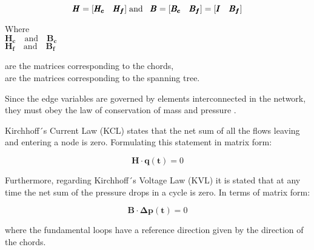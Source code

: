\begin{equation}
\pmb{H} = [\pmb{H_c} \quad \pmb{H_f}]
\hspace{0.1cm} \text{and}\hspace{0.3cm}
\pmb{B} = [\pmb{B_c}  \quad \pmb{B_f}] = [\pmb{I} \quad \pmb{B_f}]
\label{HandB}
\end{equation}

\begin{minipage}[t]{0.20\textwidth}
Where\\
\hspace*{8mm} $\pmb{H_c} \quad \text{and} \quad \pmb{B_c}$ \\
\hspace*{8mm} $\pmb{H_f} \quad \text{and} \quad \pmb{B_f}$ 
\end{minipage}
\begin{minipage}[t]{0.68\textwidth}
\vspace*{2mm}
\hspace*{8mm} are the matrices corresponding to the chords,\\
\hspace*{8mm} are the matrices corresponding to the spanning tree. 
\end{minipage}

Since the edge variables are governed by elements interconnected in the network, 
they must obey the law of conservation of mass and pressure \cite{GraphModel}. 

Kirchhoff´s Current Law (KCL) states that the net sum of all the flows leaving and entering a node is zero. Formulating this statement in matrix form:

\begin{equation}
  \label{KCL}
  \pmb{H} \cdot \pmb{q(t)} = 0
\end{equation}

Furthermore, regarding Kirchhoff´s Voltage Law (KVL) it is stated that at any time the net sum of the pressure drops in a cycle 
is zero. In terms of matrix form:

\begin{equation}
 \label{KVL} 
 \pmb{B} \cdot \pmb{\Delta p (t)} = 0
\end{equation}

where the fundamental loops have a reference direction given by the direction of the 
chords. 





 